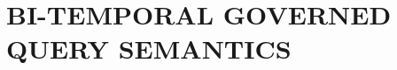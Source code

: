 
\providecommand{\Tdom}{\mathbb{T}}
\providecommand{\Qdom}{\mathbb{Q}}
\providecommand{\Wdom}{\mathcal{W}}
\providecommand{\Gfam}{\mathbb{G}}
\providecommand{\Vset}{\mathcal{V}}
\providecommand{\Gseq}{\mathcal{G}}
\providecommand{\Dpol}{\mathcal{D}}
\providecommand{\Mask}{\mathbb{M}}
\providecommand{\ver}{\mathrm{ver}}
\providecommand{\Cov}{\mathrm{Cov}}
\providecommand{\vt}{\mathrm{vt}}
\providecommand{\cmode}{\mathrm{cm}}
\providecommand{\hull}{\mathrm{hull}}
\providecommand{\Pop}{\mathrm{Pop}}
\providecommand{\Bindable}{\mathsf{Bindable}}
\providecommand{\OOV}{\mathsf{OOV}}
\providecommand{\AM}{\mathsf{AM}}
\providecommand{\MC}{\mathsf{MC}}
\providecommand{\DBL}{\mathsf{DB}}
\providecommand{\svw}{\mathrm{svw}}
\providecommand{\legn}{\mathrm{n}}
\providecommand{\legd}{\mathrm{d}}
\providecommand{\ANSW}{\mathsf{ANSWER}}
\providecommand{\REWR}{\mathsf{REWRITE}}
\providecommand{\REFU}{\mathsf{REFUSE}}
\providecommand{\Chk}{\mathsf{Chk}}
\providecommand{\ACC}{\mathsf{ACCEPT}}
\providecommand{\REJ}{\mathsf{REJECT}}
\providecommand{\sem}[1]{[\![#1]\!]}
\providecommand{\dcl}{\mathrm{cl}}
\providecommand{\Legal}{\mathrm{Legal}}
\providecommand{\SUPPMIN}{\mathrm{SUPPMIN}}
\providecommand{\Env}{\mathrm{Env}}
\providecommand{\val}{\mathrm{val}}
\providecommand{\touched}{\mathrm{touched}}
\providecommand{\ctx}{\mathrm{ctx}}
\providecommand{\dec}{\mathrm{dec}}
\providecommand{\out}{\mathrm{out}}
\providecommand{\CT}{\mathrm{CT}}
\providecommand{\srig}{S_{\mathrm{rig}}}
\providecommand{\sraw}{S_{\mathrm{raw}}}

\section{BI-TEMPORAL GOVERNED QUERY SEMANTICS}
\label{sec:semantics}

